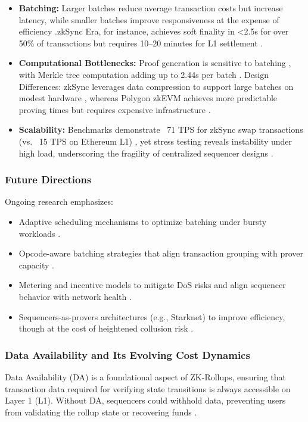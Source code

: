 \begin{itemize}
    \item \textbf{Batching:} Larger batches reduce average transaction costs but increase latency, while smaller batches improve responsiveness at the expense of efficiency \cite{ethScalingDocs}.zkSync Era, for instance, achieves soft finality in \textless 2.5s for over 50\% of transactions but requires 10–20 minutes for L1 settlement \cite{gogol2025scalingdefi}.
    \item \textbf{Computational Bottlenecks:} Proof generation is sensitive to batching \cite{chaliasos2024analyzing}, with Merkle tree computation adding up to 2.44s per batch \cite{gogol2025scalingdefi}. Design Differences: zkSync leverages data compression to support large batches on modest hardware \cite{chaliasos2024analyzing}, whereas Polygon zkEVM achieves more predictable proving times but requires expensive infrastructure \cite{chaliasos2024analyzing}.
    \item  \textbf{Scalability:} Benchmarks demonstrate ~71 TPS for zkSync swap transactions (vs. ~15 TPS on Ethereum L1) \cite{gogol2025scalingdefi}, yet stress testing reveals instability under high load, underscoring the fragility of centralized sequencer designs \cite{gogol2025scalingdefi}.
\end{itemize}

\subsubsection{Future Directions}

Ongoing research emphasizes:
\vspace{12pt}
\begin{itemize}
\item  Adaptive scheduling mechanisms to optimize batching under bursty workloads \cite{chaliasos2024analyzing}.
\item Opcode-aware batching strategies that align transaction grouping with prover capacity \cite{chaliasos2024analyzing}.
\item Metering and incentive models to mitigate DoS risks and align sequencer behavior with network health \cite{chaliasos2024pricing}.
\item Sequencers-as-provers architectures (e.g., Starknet) to improve efficiency, though at the cost of heightened collusion risk \cite{motepalli2023sok}.
\end{itemize}

\subsubsection{Data Availability and Its Evolving Cost Dynamics}
\vspace{12pt}
Data Availability (DA) is a foundational aspect of ZK-Rollups, ensuring that transaction data required for verifying state transitions is always accessible on Layer 1 (L1). Without DA, sequencers could withhold data, preventing users from validating the rollup state or recovering funds \cite{saif2024survey}.

